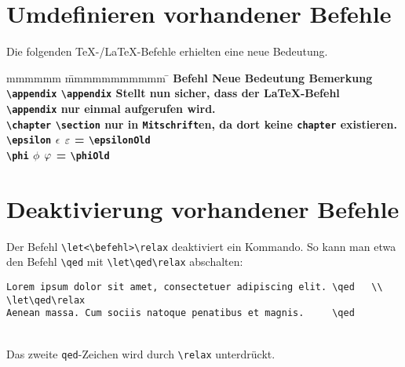 		\section{Umdefinieren vorhandener Befehle}
			Die folgenden \TeX-/\LaTeX-Befehle erhielten eine neue Bedeutung. 
			\begin{tabbing}
				mmmmmm			\= mmmmmmmmmmm			\= \kill
				\bf Befehl 		\> \bf Neue Bedeutung	\> \bf Bemerkung																										\\
				\verb|\appendix|\> \verb|\appendix|		\> Stellt nun sicher, dass der \LaTeX-Befehl 																			\\
								\> 						\> \verb|\appendix| nur einmal aufgerufen wird.																			\\
				\verb|\chapter|	\> \verb|\section|		\> nur in \texttt{Mitschrift}en, da dort keine \texttt{chapter} existieren.												\\
				\verb|\epsilon|	\> $\epsilon$			\> $\epsilonOld$ = \verb|\epsilonOld|																					\\
				\verb|\phi|		\> $\phi$				\> $\phiOld$ = \verb|\phiOld|
			\end{tabbing}
		\section{Deaktivierung vorhandener Befehle}
			Der Befehl \verb|\let<\befehl>\relax| deaktiviert ein Kommando. So kann man etwa den Befehl \verb|\qed| mit \verb|\let\qed\relax| abschalten:
			\begin{verbatim}
Lorem ipsum dolor sit amet, consectetuer adipiscing elit. \qed   \\
\let\qed\relax 
Aenean massa. Cum sociis natoque penatibus et magnis.     \qed
			\end{verbatim} 
			
			\vspace*{1em}\\
			  Das zweite \texttt{qed}-Zeichen wird durch \verb|\relax| unterdrückt.
			
